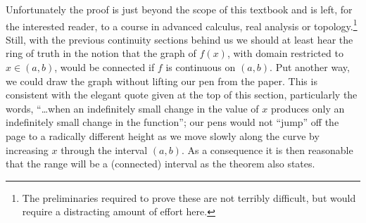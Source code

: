  Unfortunately the proof is just
beyond the scope of this textbook 
and is left, for the interested reader, to a course in 
advanced calculus, real analysis or topology.\footnote{%
The preliminaries required to prove these are not
terribly difficult, but would require a distracting
amount of effort here.}  
Still,
with the previous continuity sections
behind us we should at least hear the ring of truth
in the notion that the graph of $f(x)$,
with domain restricted to $x\in(a,b)$, would be connected
if $f$ is continuous on $(a,b)$.
Put another way, we could draw the graph without lifting
our  pen from the paper.  
 This is consistent with the elegant quote given 
at the top of this section, particularly the words,
``\dots{}when an indefinitely small change in the value of 
$x$ produces only an indefinitely small change in the function'';
our pens would not ``jump'' off the page to a radically different height
as we move slowly along the curve by increasing $x$
through the interval $(a,b)$. As a consequence it is then reasonable that
the range will be a (connected) interval as the theorem also states.
\newpage


